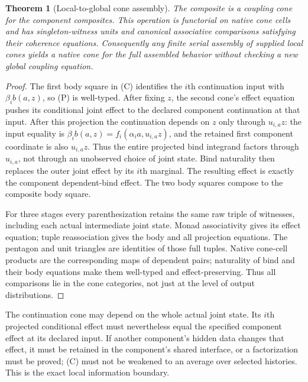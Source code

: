 \documentclass[11pt]{article}
\newtheorem{theorem}{Theorem}\newtheorem{proposition}{Proposition}
\begin{document}
\begin{theorem}[Local-to-global cone assembly]
The composite is a coupling cone for the component composites. This operation is functorial on native cone cells and has singleton-witness units and canonical associative comparisons satisfying their coherence equations. Consequently any finite serial assembly of supplied local cones yields a native cone for the full assembled behavior without checking a new global coupling equation.
\end{theorem}
\begin{proof}
The first body square in (C) identifies the $i$th continuation input with $\beta_i b(a,z)$, so (P) is well-typed. After fixing $z$, the second cone's effect equation pushes its conditional joint effect to the declared component continuation at that input. After this projection the continuation depends on $z$ only through $u_{i,a}z$: the input equality is $\beta_i b(a,z)=f_i(\alpha_i a,u_{i,a}z)$, and the retained first component coordinate is also $u_{i,a}z$. Thus the entire projected bind integrand factors through $u_{i,a}$, not through an unobserved choice of joint state. Bind naturality then replaces the outer joint effect by its $i$th marginal. The resulting effect is exactly the component dependent-bind effect. The two body squares compose to the composite body square.

For three stages every parenthesization retains the same raw triple of witnesses, including each actual intermediate joint state. Monad associativity gives its effect equation; tuple reassociation gives the body and all projection equations. The pentagon and unit triangles are identities of those full tuples. Native cone-cell products are the corresponding maps of dependent pairs; naturality of bind and their body equations make them well-typed and effect-preserving. Thus all comparisons lie in the cone categories, not just at the level of output distributions.
\end{proof}

The continuation cone may depend on the whole actual joint state. Its $i$th projected conditional effect must nevertheless equal the specified component effect at its declared input. If another component's hidden data changes that effect, it must be retained in the component's shared interface, or a factorization must be proved; (C) must not be weakened to an average over selected histories. This is the exact local information boundary.
\end{document}
